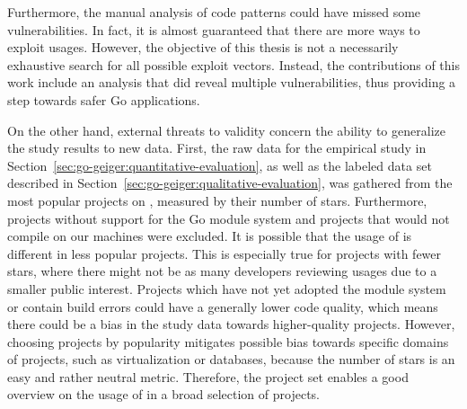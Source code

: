 Furthermore, the manual analysis of \unsafe{} code patterns could have missed some vulnerabilities.
In fact, it is almost guaranteed that there are more ways to exploit \unsafe{} usages.
However, the objective of this thesis is not a necessarily exhaustive search for all possible exploit vectors.
Instead, the contributions of this work include an analysis that did reveal multiple vulnerabilities, thus providing a
step towards safer Go applications.

On the other hand, external threats to validity concern the ability to generalize the study results to new data.
First, the raw data for the empirical study in Section~\ref{sec:go-geiger:quantitative-evaluation}, as well as the
labeled data set described in Section~\ref{sec:go-geiger:qualitative-evaluation}, was gathered from the most popular
projects on \github{}, measured by their number of stars.
Furthermore, projects without support for the Go module system and projects that would not compile on our machines were
excluded.
It is possible that the usage of \unsafe{} is different in less popular projects.
This is especially true for projects with fewer stars, where there might not be as many developers reviewing \unsafe{}
usages due to a smaller public interest.
Projects which have not yet adopted the module system or contain build errors could have a generally lower code quality,
which means there could be a bias in the study data towards higher-quality projects.
However, choosing projects by popularity mitigates possible bias towards specific domains of projects, such as
virtualization or databases, because the number of stars is an easy and rather neutral metric.
Therefore, the project set enables a good overview on the usage of \unsafe{} in a broad selection of projects.
